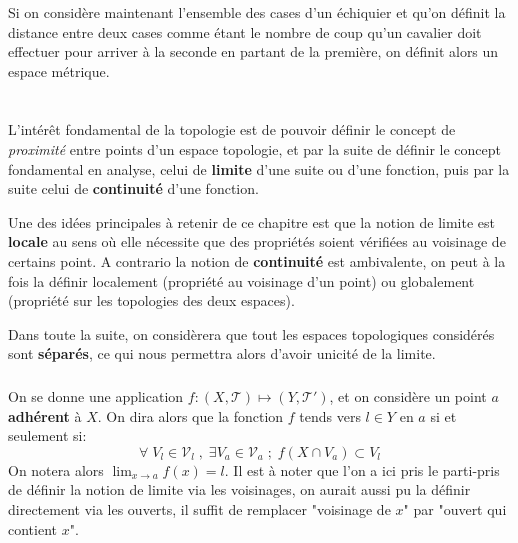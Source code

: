 \subsection*{}
Si on considère maintenant l'ensemble des cases d'un échiquier et qu'on définit la distance entre deux cases comme étant le nombre de coup qu'un cavalier doit effectuer pour arriver à la seconde en partant de la première, on définit alors un espace métrique.

\chapter*{}
L'intérêt fondamental de la topologie est de pouvoir définir le concept de \textit{proximité} entre points d'un espace topologie, et par la suite de définir le concept fondamental en analyse, celui de \textbf{limite} d'une suite ou d'une fonction, puis par la suite celui de \textbf{continuité} d'une fonction.\<

Une des idées principales à retenir de ce chapitre est que la notion de limite est \textbf{locale} au sens où elle nécessite que des propriétés soient vérifiées au voisinage de certains point. A contrario la notion de \textbf{continuité} est ambivalente, on peut à la fois la définir localement (propriété au voisinage d'un point) ou globalement (propriété sur les topologies des deux espaces).\<

Dans toute la suite, on considèrera que tout les espaces topologiques considérés sont \textbf{séparés}, ce qui nous permettra alors d'avoir unicité de la limite.

\subsection*{}
On se donne une application \(f : (X, \mathcal{T}) \longmapsto (Y, \mathcal{T}')\), et on considère un point \(a\) \textbf{adhérent} à \(X\). On dira alors que la fonction \(f\) tends vers \(l \in Y\) en \(a\) si et seulement si:
\[
   \forall \; V_l \in \mathscr{V}_l \; , \; \exists  V_a \in \mathscr{V}_a \; ; \; f(X \cap V_a) \subset V_l 
\]
On notera alors \(\lim_{x \rightarrow a} f(x) = l\). Il est à noter que l'on a ici pris le parti-pris de définir la notion de limite via les voisinages, on aurait aussi pu la définir directement via les ouverts, il suffit de remplacer "voisinage de \(x\)" par "ouvert qui contient \(x\)".
